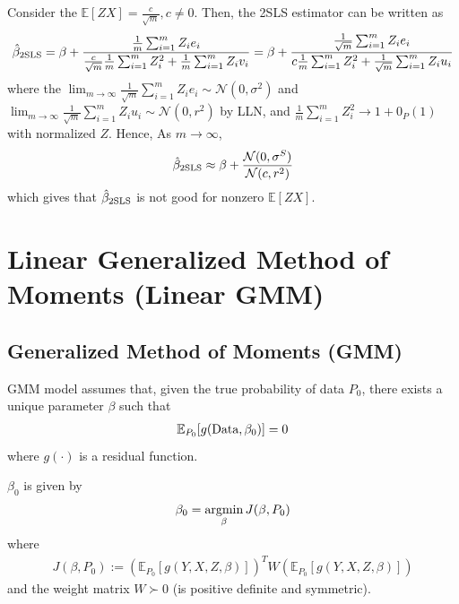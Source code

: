 \documentclass[11pt]{elegantbook}
\newcommand{\argmin}{\operatornamewithlimits{argmin}}
\begin{document}
Consider the $\mathbb{E}[ZX]=\frac{c}{\sqrt{m}},c\neq 0$. Then, the 2SLS estimator can be written as
\begin{equation}
    \begin{aligned}
        \hat{\beta}_\textnormal{2SLS}=\beta+\frac{\frac{1}{m}\sum_{i=1}^mZ_ie_i}{\frac{c}{\sqrt{m}}\frac{1}{m}\sum_{i=1}^mZ_i^2+\frac{1}{m}\sum_{i=1}^mZ_iv_i}=\beta+\frac{\frac{1}{\sqrt{m}}\sum_{i=1}^mZ_ie_i}{c\frac{1}{m}\sum_{i=1}^mZ_i^2+\frac{1}{\sqrt{m}}\sum_{i=1}^mZ_iu_i}
    \end{aligned}
    \nonumber
\end{equation}
where the $\lim_{m \rightarrow \infty}\frac{1}{\sqrt{m}}\sum_{i=1}^mZ_ie_i\sim \mathcal{N}(0,\sigma^2)$ and $\lim_{m \rightarrow \infty}\frac{1}{\sqrt{m}}\sum_{i=1}^mZ_iu_i\sim \mathcal{N}(0,r^2)$ by LLN, and $\frac{1}{m}\sum_{i=1}^mZ_i^2 \rightarrow 1+0_P(1)$ with normalized $Z$. Hence, As $m \rightarrow \infty$,
\begin{equation}
    \begin{aligned}
        \hat{\beta}_\textnormal{2SLS}\approx \beta+\frac{\mathcal{N}(0,\sigma^S)}{\mathcal{N}(c,r^2)}
    \end{aligned}
    \nonumber
\end{equation}
which gives that $\hat{\beta}_\textnormal{2SLS}$ is not good for nonzero $\mathbb{E}[ZX]$.


\section{Linear Generalized Method of Moments (Linear GMM)}
\subsection{Generalized Method of Moments (GMM)}
\begin{assumption}
    GMM model assumes that, given the true probability of data $P_0$, there exists a unique parameter $\beta$ such that
    \begin{equation}
        \begin{aligned}
            \mathbb{E}_{P_0}[g(\textnormal{Data},\beta_0)]=0
        \end{aligned}
        \nonumber
    \end{equation}
    where $g(\cdot)$ is a residual function.
\end{assumption}
$\beta_0$ is given by
\begin{equation}
    \begin{aligned}
        \beta_0=\argmin_{\beta}J(\beta,P_0)
    \end{aligned}
    \nonumber
\end{equation}
where
\begin{equation}
    \begin{aligned}
        J(\beta,P_0):=\left(\mathbb{E}_{P_0}[g(Y,X,Z,\beta)]\right)^TW\left(\mathbb{E}_{P_0}[g(Y,X,Z,\beta)]\right)
    \end{aligned}
    \nonumber
\end{equation}
and the weight matrix $W\succ 0$ (is positive definite and symmetric).
\end{document}
